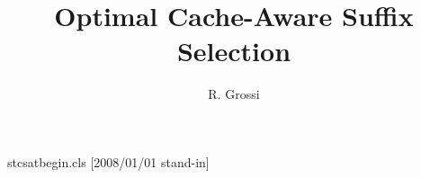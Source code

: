\begin{filecontents*}{stcsatbegin.cls}
[2008/01/01 stand-in]
\def\@setaddresses{\par\begingroup\def\address##1##2{##2\par}%
  \def\curraddr##1##2{Current address: ##2\par}\def\email##1##2{E-mail address: ##2\par}%
  \def\urladdr##1##2{URL: ##2\par}\addresses\endgroup}
\def\@maketitle{\@settitle\ifx\@empty\authors\else\@setauthors\fi\@setaddresses}
\def\enddoc@text{}
\end{filecontents*}
\documentclass{stcsatbegin}

\title{Optimal Cache-Aware Suffix Selection}
\author{R. Grossi}
\address{Dipartimento di Informatica, Universita di Pisa}
\maketitle
Body.

